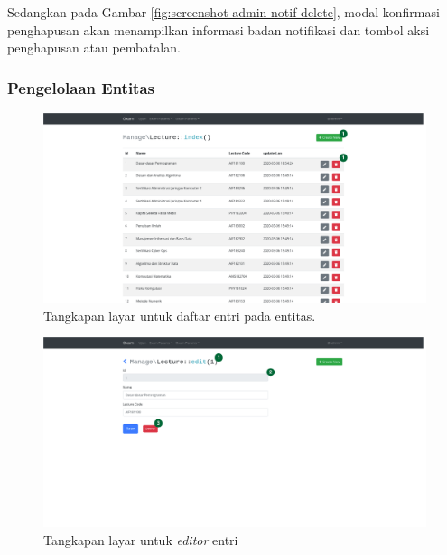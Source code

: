     Sedangkan pada Gambar \ref{fig:screenshot-admin-notif-delete}, modal konfirmasi penghapusan akan menampilkan
    informasi badan notifikasi dan tombol aksi penghapusan atau pembatalan.
    
    \subsubsection{Pengelolaan Entitas}
    \begin{figure}
        \centering
        \includegraphics[width=0.7\paperwidth]{Gambar/implemented-interface/admin/entity-lister.png}
        \caption{Tangkapan layar untuk daftar entri pada entitas.}
        \label{fig:screenshot-admin-entity-list}
    \end{figure}
    \begin{figure}
        \centering
        \includegraphics[width=0.7\paperwidth]{Gambar/implemented-interface/admin/entity-editor.png}
        \caption{Tangkapan layar untuk \textit{editor} entri}
        \label{fig:screenshot-admin-entity-edit}
    \end{figure}
